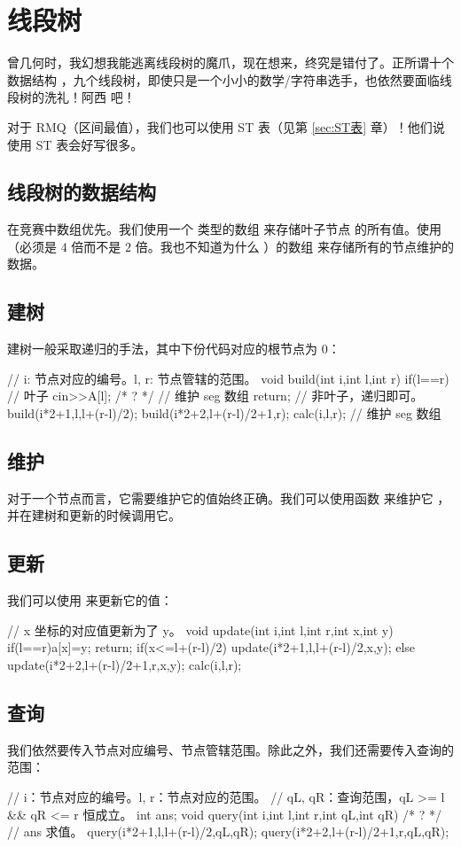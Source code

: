 \section{线段树} \label{sec:线段树}

曾几何时，我幻想我能逃离线段树的魔爪，现在想来，终究是错付了。正所谓十个数据结构
，九个线段树，即使只是一个小小的数学/字符串选手，也依然要面临线段树的洗礼！阿西
吧！

对于 RMQ（区间最值），我们也可以使用 ST 表（见第 \ref{sec:ST表} 章）！他们说使用
ST 表会好写很多。

\subsection{线段树的数据结构}
在竞赛中数组优先。我们使用一个  类型的数组  来存储叶子节点
的所有值。使用 （必须是 $4$ 倍而不是 $2$ 倍。我也不知道为什么
）的数组  来存储所有的节点维护的数据。

\subsection{建树}
建树一般采取递归的手法，其中下份代码对应的根节点为 $0$：
\begin{Cpp}
// i: 节点对应的编号。l, r: 节点管辖的范围。
void build(int i,int l,int r){
  if(l==r){ // 叶子
    cin>>A[l];
    /* ? */ // 维护 seg 数组
    return;
  }
  // 非叶子，递归即可。
  build(i*2+1,l,l+(r-l)/2);
  build(i*2+2,l+(r-l)/2+1,r);
  calc(i,l,r); // 维护 seg 数组
}
\end{Cpp}

\subsection{维护}
对于一个节点而言，它需要维护它的值始终正确。我们可以使用函数  来维护它
，并在建树和更新的时候调用它。

\subsection{更新}
我们可以使用  来更新它的值：
\begin{Cpp}
// x 坐标的对应值更新为了 y。
void update(int i,int l,int r,int x,int y){
  if(l==r){a[x]=y; return;}
  if(x<=l+(r-l)/2)
    update(i*2+1,l,l+(r-l)/2,x,y);
  else
    update(i*2+2,l+(r-l)/2+1,r,x,y);
  calc(i,l,r);
}
\end{Cpp}

\subsection{查询}
我们依然要传入节点对应编号、节点管辖范围。除此之外，我们还需要传入查询的范围：
\begin{Cpp}
// i：节点对应的编号。l, r：节点对应的范围。
// qL, qR：查询范围，qL >= l && qR <= r 恒成立。
int ans;
void query(int i,int l,int r,int qL,int qR){
  /* ? */ // ans 求值。
  query(i*2+1,l,l+(r-l)/2,qL,qR);
  query(i*2+2,l+(r-l)/2+1,r,qL,qR);
}
\end{Cpp}

